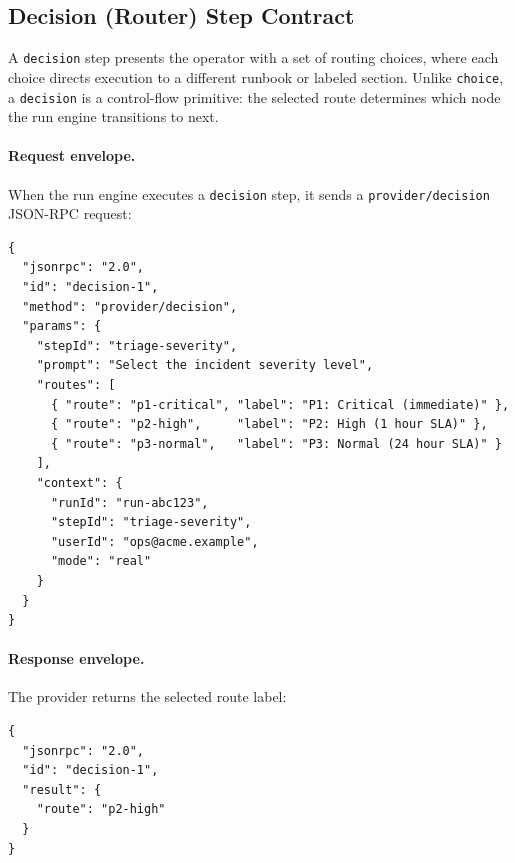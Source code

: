 \subsection{Decision (Router) Step Contract}
\label{subsec:decision-contract}

A \texttt{decision} step presents the
operator with a set of routing choices, where each choice directs execution to
a different runbook or labeled section.  Unlike \texttt{choice}, a
\texttt{decision} is a control-flow primitive: the selected route determines
which node the run engine transitions to next.

\paragraph{Request envelope.}
When the run engine executes a \texttt{decision} step, it sends a
\texttt{provider/decision} JSON-RPC request:

\begin{verbatim}
{
  "jsonrpc": "2.0",
  "id": "decision-1",
  "method": "provider/decision",
  "params": {
    "stepId": "triage-severity",
    "prompt": "Select the incident severity level",
    "routes": [
      { "route": "p1-critical", "label": "P1: Critical (immediate)" },
      { "route": "p2-high",     "label": "P2: High (1 hour SLA)" },
      { "route": "p3-normal",   "label": "P3: Normal (24 hour SLA)" }
    ],
    "context": {
      "runId": "run-abc123",
      "stepId": "triage-severity",
      "userId": "ops@acme.example",
      "mode": "real"
    }
  }
}
\end{verbatim}

\paragraph{Response envelope.}
The provider returns the selected route label:

\begin{verbatim}
{
  "jsonrpc": "2.0",
  "id": "decision-1",
  "result": {
    "route": "p2-high"
  }
}
\end{verbatim}

